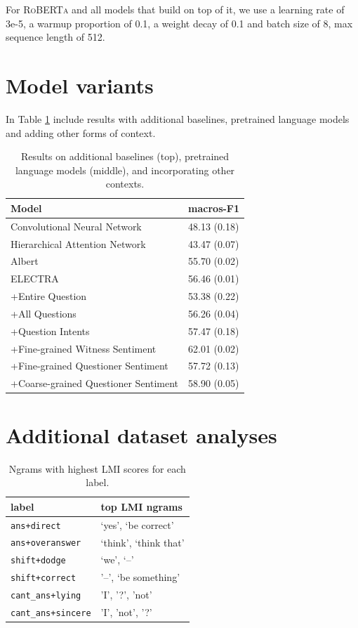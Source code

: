 For \textsc{RoBERTa} and all models that build on top of it, we use a learning rate of 3e-5, a warmup proportion of 0.1, a weight decay of 0.1 and batch size of 8, max sequence length of 512.

\section{Model variants}
\label{sec:app_variants}

In Table \ref{tab:other_models} include results with additional baselines, pretrained language models and adding other forms of context.

\begin{table}[t]
\centering
\small
\begin{tabular}{ll}
\toprule
Model & macros-F1\\
\midrule
Convolutional Neural Network &48.13 (0.18) \\
Hierarchical Attention Network &43.47 (0.07)\\
\midrule
Albert &55.70 (0.02)\\
ELECTRA &56.46 (0.01)\\
\midrule
+Entire Question &53.38 (0.22)\\
+All Questions &56.26 (0.04) \\
+Question Intents &57.47 (0.18)\\
+Fine-grained Witness Sentiment &62.01 (0.02)\\
+Fine-grained Questioner Sentiment &57.72 (0.13)\\
+Coarse-grained Questioner Sentiment &58.90 (0.05)\\
\bottomrule
\end{tabular}
\caption{Results on additional baselines (top), pretrained language models (middle), and incorporating other contexts.}
\label{tab:other_models}
\end{table}

\section{Additional dataset analyses}
\label{sec:app_lmi}

\begin{table}[t]
\centering
\small
\begin{tabular}{ll}
\toprule
label  & top LMI ngrams\\ 
\midrule
\texttt{ans+direct}  &`yes', `be correct'  \\
\texttt{ans+overanswer} &`think', `think that' \\
\texttt{shift+dodge} &`we', `--'\\
\texttt{shift+correct} &'--', `be something'\\
\texttt{cant\_ans+lying} &'I', '?', 'not'\\
\texttt{cant\_ans+sincere} &'I', 'not', '?'\\
\bottomrule
\end{tabular}
\caption{Ngrams with highest LMI scores for each label.}
\label{tab:subj_lmi}
\end{table}

